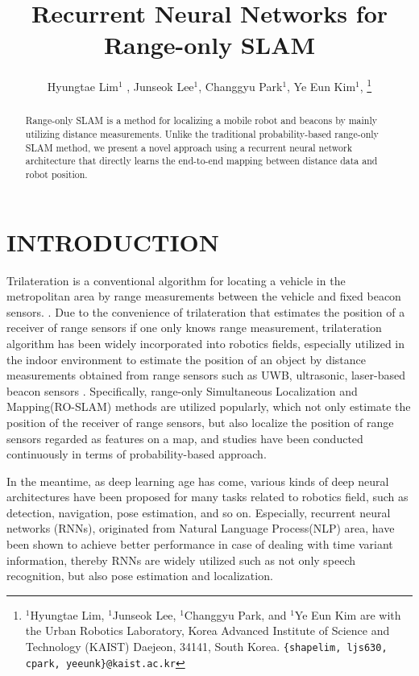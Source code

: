 \documentclass[letterpaper, 10 pt, conference]{ieeeconf}  %
\title{\LARGE \bf
Recurrent Neural Networks for Range-only SLAM}
\author{Hyungtae Lim$^{1}$ , Junseok Lee$^{1}$, Changgyu Park$^{1}$, Ye Eun Kim$^{1}$, %
\thanks{$^{1}$Hyungtae Lim, $^{1}$Junseok Lee, $^{1}$Changgyu Park, and $^{1}$Ye Eun Kim are with
	the Urban Robotics Laboratory, Korea Advanced Institute of Science
	and Technology (KAIST) Daejeon, 34141, South Korea. {\tt\small \{shapelim, ljs630, cpark, yeeunk\}@kaist.ac.kr}}%
%
}
\begin{document}


\maketitle
\thispagestyle{empty}
\pagestyle{empty}


\begin{abstract}

Range-only SLAM is a method for localizing a mobile robot and beacons by mainly utilizing distance measurements. Unlike the traditional probability-based range-only SLAM method, we present a novel approach using a recurrent neural network architecture that directly learns the end-to-end mapping between distance data and robot position.

\end{abstract}


\section{INTRODUCTION}

 
 Trilateration is a conventional algorithm for locating a vehicle in the metropolitan area by range measurements between the vehicle and fixed beacon sensors. \cite{staras1972accuracy}. Due to the convenience of trilateration that estimates the position of a receiver of range sensors if one only knows range measurement, trilateration algorithm has been widely incorporated into robotics fields, especially utilized in the indoor environment to estimate the position of an object by distance measurements obtained from range sensors such as UWB, ultrasonic, laser-based beacon sensors \cite{thomas2005revisiting, cho2010mobile,raghavan2010accurate}. Specifically, range-only Simultaneous Localization and Mapping(RO-SLAM) methods are utilized popularly, which not only estimate the position of the receiver of range sensors, but also localize the position of range sensors regarded as features on a map, and studies have been conducted continuously in terms of probability-based approach\cite{blanco2008pure, blanco2008efficient,fabresse2013undelayed, shetty2018particle}.
 
 In the meantime, as deep learning age has come\cite{lecun2015deep}, various kinds of deep neural architectures have been proposed for many tasks related to robotics field, such as detection\cite{lenz2015deep,cai2016unified, smith2018object}, navigation\cite{zhu2017target, hamandi2018deepmotion}, pose estimation\cite{walch2017image}, and so on. Especially, recurrent neural networks (RNNs), originated from Natural Language Process(NLP) area\cite{elman1990finding}, have been shown to achieve better performance in case of dealing with time variant information, thereby RNNs are widely utilized such as not only speech recognition, but also pose estimation and localization\cite{walch2017image, gladh2016deep, wang2017deepvo, kendall2015posenet, turan2018deep}. 
 
\end{document}
